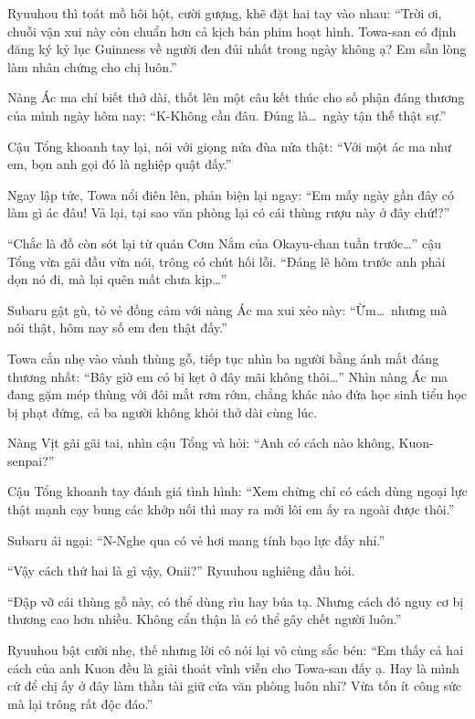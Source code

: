 \documentclass[../main.tex]{subfiles}
\begin{document}
Ryuuhou thì toát mồ hôi hột, cười gượng, khẽ đặt hai tay vào nhau: ``Trời ơi, chuỗi vận xui này còn chuẩn hơn cả kịch bản phim hoạt hình. Towa-san có định đăng ký kỷ lục Guinness về người đen đủi nhất trong ngày không ạ? Em sẵn lòng làm nhân chứng cho chị luôn.''

Nàng Ác ma chỉ biết thở dài, thốt lên một câu kết thúc cho số phận đáng thương của mình ngày hôm nay: ``K-Không cần đâu. Đúng là\dots\ ngày tận thế thật sự.''

Cậu Tổng khoanh tay lại, nói với giọng nửa đùa nửa thật: ``Với một ác ma như em, bọn anh gọi đó là nghiệp quật đấy.''

Ngay lập tức, Towa nổi điên lên, phản biện lại ngay: ``Em mấy ngày gần đây có làm gì ác đâu! Vả lại, tại sao văn phòng lại có cái thùng rượu này ở đây chứ!?''

``Chắc là đồ còn sót lại từ quán Cơm Nắm của Okayu-chan tuần trước\dots'' cậu Tổng vừa gãi đầu vừa nói, trông có chút hối lỗi. ``Đáng lẽ hôm trước anh phải dọn nó đi, mà lại quên mất chưa kịp\dots''

Subaru gật gù, tỏ vẻ đồng cảm với nàng Ác ma xui xẻo này: ``Ừm\dots\ nhưng mà nói thật, hôm nay số em đen thật đấy.''

Towa cắn nhẹ vào vành thùng gỗ, tiếp tục nhìn ba người bằng ánh mắt đáng thương nhất: ``Bây giờ em có bị kẹt ở đây mãi không thôi\dots'' Nhìn nàng Ác ma đang gặm mép thùng với đôi mắt rơm rớm, chẳng khác nào đứa học sinh tiểu học bị phạt đứng, cả ba người không khỏi thở dài cùng lúc.


Nàng Vịt gãi gãi tai, nhìn cậu Tổng và hỏi: ``Anh có cách nào không, Kuon-senpai?''

Cậu Tổng khoanh tay đánh giá tình hình: ``Xem chừng chỉ có cách dùng ngoại lực thật mạnh cạy bung các khớp nối thì may ra mới lôi em ấy ra ngoài được thôi.''

Subaru ái ngại: ``N-Nghe qua có vẻ hơi mang tính bạo lực đấy nhỉ.''

``Vậy cách thứ hai là gì vậy, Onii?'' Ryuuhou nghiêng đầu hỏi.

``Đập vỡ cái thùng gỗ này, có thể dùng rìu hay búa tạ. Nhưng cách đó nguy cơ bị thương cao hơn nhiều. Không cẩn thận là có thể gây chết người luôn.''

Ryuuhou bật cười nhẹ, thế nhưng lời cô nói lại vô cùng sắc bén: ``Em thấy cả hai cách của anh Kuon đều là giải thoát vĩnh viễn cho Towa-san đấy ạ. Hay là mình cứ để chị ấy ở đây làm thần tài giữ cửa văn phòng luôn nhỉ? Vừa tốn ít công sức mà lại trông rất độc đáo.''
\end{document}
